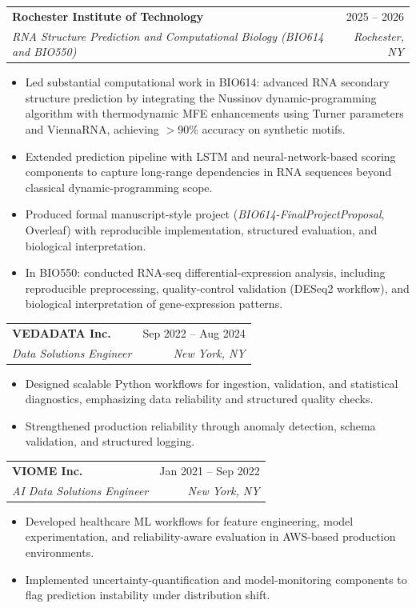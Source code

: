 \documentclass[11pt]{article}
\makeatletter
\newcommand{\entry}[4]{
  \noindent\begin{tabularx}{\textwidth}{@{}Xr@{}}
    \textbf{#1} & #2 \\
    \textit{#3} & \textit{#4}
  \end{tabularx}\vspace{2pt}
}
\makeatother
\begin{document}
\entry{Rochester Institute of Technology}{2025 -- 2026}{RNA Structure Prediction and Computational Biology (BIO614 and BIO550)}{Rochester, NY}
\begin{itemize}
  \item Led substantial computational work in BIO614: advanced RNA secondary structure prediction by integrating the Nussinov dynamic-programming algorithm with thermodynamic MFE enhancements using Turner parameters and ViennaRNA, achieving $>$90\% accuracy on synthetic motifs.
  \item Extended prediction pipeline with LSTM and neural-network-based scoring components to capture long-range dependencies in RNA sequences beyond classical dynamic-programming scope.
  \item Produced formal manuscript-style project (\textit{BIO614-FinalProjectProposal}, Overleaf) with reproducible implementation, structured evaluation, and biological interpretation.
  \item In BIO550: conducted RNA-seq differential-expression analysis, including reproducible preprocessing, quality-control validation (DESeq2 workflow), and biological interpretation of gene-expression patterns.
\end{itemize}

\entry{VEDADATA Inc.}{Sep 2022 -- Aug 2024}{Data Solutions Engineer}{New York, NY}
\begin{itemize}
  \item Designed scalable Python workflows for ingestion, validation, and statistical diagnostics, emphasizing data reliability and structured quality checks.
  \item Strengthened production reliability through anomaly detection, schema validation, and structured logging.
\end{itemize}

\entry{VIOME Inc.}{Jan 2021 -- Sep 2022}{AI Data Solutions Engineer}{New York, NY}
\begin{itemize}
  \item Developed healthcare ML workflows for feature engineering, model experimentation, and reliability-aware evaluation in AWS-based production environments.
  \item Implemented uncertainty-quantification and model-monitoring components to flag prediction instability under distribution shift.
\end{itemize}
\end{document}

